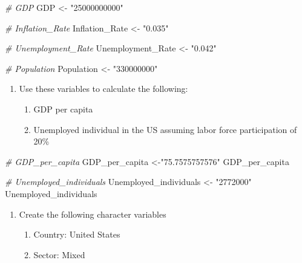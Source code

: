 \documentclass[
]{article}
\newenvironment{Shaded}{\begin{snugshade}}{\end{snugshade}}
\newcommand{\CommentTok}[1]{\textcolor[rgb]{0.56,0.35,0.01}{\textit{#1}}}
\newcommand{\NormalTok}[1]{#1}
\newcommand{\OtherTok}[1]{\textcolor[rgb]{0.56,0.35,0.01}{#1}}
\newcommand{\StringTok}[1]{\textcolor[rgb]{0.31,0.60,0.02}{#1}}
\providecommand{\tightlist}{%
  \setlength{\itemsep}{0pt}\setlength{\parskip}{0pt}}
\begin{document}
\begin{Shaded}
\begin{Highlighting}[]
\CommentTok{\# GDP}
\NormalTok{GDP }\OtherTok{\textless{}{-}} \StringTok{"25000000000"}
    
\CommentTok{\# Inflation\_Rate}
\NormalTok{Inflation\_Rate }\OtherTok{\textless{}{-}} \StringTok{"0.035"}
    
\CommentTok{\# Unemployment\_Rate}
\NormalTok{Unemployment\_Rate }\OtherTok{\textless{}{-}} \StringTok{"0.042"}

\CommentTok{\# Population}
\NormalTok{Population }\OtherTok{\textless{}{-}} \StringTok{"330000000"}
\end{Highlighting}
\end{Shaded}

\begin{enumerate}
\def\labelenumi{\arabic{enumi}.}
\setcounter{enumi}{1}
\tightlist
\item
  Use these variables to calculate the following:

  \begin{enumerate}
  \def\labelenumii{\alph{enumii}.}
  \tightlist
  \item
    GDP per capita
  \item
    Unemployed individual in the US assuming labor force participation
    of 20\%
  \end{enumerate}
\end{enumerate}

\begin{Shaded}
\begin{Highlighting}[]
\CommentTok{\# GDP\_per\_capita}
\NormalTok{GDP\_per\_capita }\OtherTok{\textless{}{-}}\StringTok{"75.7575757576"}
\NormalTok{GDP\_per\_capita    }

\CommentTok{\# Unemployed\_individuals}
\NormalTok{Unemployed\_individuals }\OtherTok{\textless{}{-}} \StringTok{"2772000"}
\NormalTok{Unemployed\_individuals}
\end{Highlighting}
\end{Shaded}

\begin{enumerate}
\def\labelenumi{\arabic{enumi}.}
\setcounter{enumi}{2}
\tightlist
\item
  Create the following character variables

  \begin{enumerate}
  \def\labelenumii{\alph{enumii}.}
  \tightlist
  \item
    Country: United States
  \item
    Sector: Mixed
  \end{enumerate}
\end{enumerate}
\end{document}
